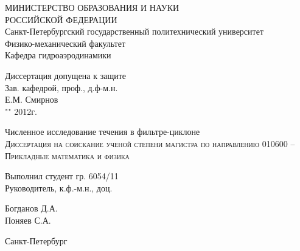 \begin{titlepage}
	\begin{center}
		\small{МИНИСТЕРСТВО ОБРАЗОВАНИЯ И НАУКИ \\ РОССИЙСКОЙ ФЕДЕРАЦИИ \\
Санкт-Петербургский государственный политехнический университет \\
Физико-механический факультет \\
Кафедра гидроаэродинамики}\\
		\vspace{0.05\textheight}
	\end{center}
	\begin{flushright}
		\normalsize
			Диссертация допущена к защите \\
			Зав. кафедрой, проф., д.ф-м.н.\\
			\underline{\hspace{7em}} Е.М. Смирнов \\
			"\underline{\hspace{2em}}" \underline{\hspace{9em}} 2012г. \\
	\end{flushright}
	\begin{center}
		\vspace{0.1\textheight}
		\large{Численное исследование течения в фильтре-циклоне}\\
		\vspace{0.01\textheight}
		\normalsize
		\textsc{Диссертация на соискание ученой степени магистра по направлению 010600 – Прикладные математика и физика}
		\vspace{0.25\textheight}
	\end{center}
	\begin{minipage}{0.48\textwidth}
		\begin{flushleft}
			Выполнил студент гр. 6054/11\\
			Руководитель, к.ф.-м.н., доц.\\
		\end{flushleft}
	\end{minipage}
	\begin{minipage}{0.5\textwidth}
		\begin{flushright}
			Богданов Д.А. \\
			Поняев С.А. \\
		\end{flushright}
	\end{minipage}
	\vspace{0.1\textheight}
	\begin{center}
		Санкт-Петербург \\
		\the\year
	\end{center}
\end{titlepage}
\newpage
